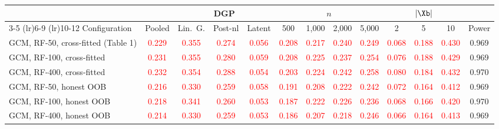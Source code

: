 \begin{tabular}{lcccccccccccc}
    \toprule
     & & \multicolumn{3}{c}{DGP} & \multicolumn{4}{c}{$n$} & \multicolumn{3}{c}{$|\Xb|$} & \\
    \cmidrule(lr){3-5} \cmidrule(lr){6-9} \cmidrule(lr){10-12}
    Configuration & Pooled & Lin.\ G. & Post-nl & Latent & 500 & 1{,}000 & 2{,}000 & 5{,}000 & 2 & 5 & 10 & Power \\
    \midrule
    GCM, RF-50, cross-fitted (Table 1)   & \textcolor{red}{0.229} & \textcolor{red}{0.355} & \textcolor{red}{0.274} & \textcolor{red}{0.056} & \textcolor{red}{0.208} & \textcolor{red}{0.217} & \textcolor{red}{0.240} & \textcolor{red}{0.249} & \textcolor{red}{0.068} & \textcolor{red}{0.188} & \textcolor{red}{0.430} & 0.969 \\
    GCM, RF-100, cross-fitted            & \textcolor{red}{0.231} & \textcolor{red}{0.355} & \textcolor{red}{0.280} & \textcolor{red}{0.059} & \textcolor{red}{0.208} & \textcolor{red}{0.225} & \textcolor{red}{0.237} & \textcolor{red}{0.254} & \textcolor{red}{0.076} & \textcolor{red}{0.188} & \textcolor{red}{0.429} & 0.969 \\
    GCM, RF-400, cross-fitted            & \textcolor{red}{0.232} & \textcolor{red}{0.354} & \textcolor{red}{0.288} & \textcolor{red}{0.054} & \textcolor{red}{0.203} & \textcolor{red}{0.224} & \textcolor{red}{0.242} & \textcolor{red}{0.258} & \textcolor{red}{0.080} & \textcolor{red}{0.184} & \textcolor{red}{0.432} & 0.970 \\
    GCM, RF-50, honest OOB               & \textcolor{red}{0.216} & \textcolor{red}{0.330} & \textcolor{red}{0.259} & \textcolor{red}{0.058} & \textcolor{red}{0.191} & \textcolor{red}{0.208} & \textcolor{red}{0.222} & \textcolor{red}{0.242} & \textcolor{red}{0.072} & \textcolor{red}{0.164} & \textcolor{red}{0.412} & 0.969 \\
    GCM, RF-100, honest OOB              & \textcolor{red}{0.218} & \textcolor{red}{0.341} & \textcolor{red}{0.260} & \textcolor{red}{0.053} & \textcolor{red}{0.187} & \textcolor{red}{0.222} & \textcolor{red}{0.226} & \textcolor{red}{0.236} & \textcolor{red}{0.068} & \textcolor{red}{0.166} & \textcolor{red}{0.420} & 0.970 \\
    GCM, RF-400, honest OOB              & \textcolor{red}{0.214} & \textcolor{red}{0.330} & \textcolor{red}{0.259} & \textcolor{red}{0.053} & \textcolor{red}{0.186} & \textcolor{red}{0.207} & \textcolor{red}{0.218} & \textcolor{red}{0.246} & \textcolor{red}{0.066} & \textcolor{red}{0.164} & \textcolor{red}{0.413} & 0.969 \\

\end{tabular}
